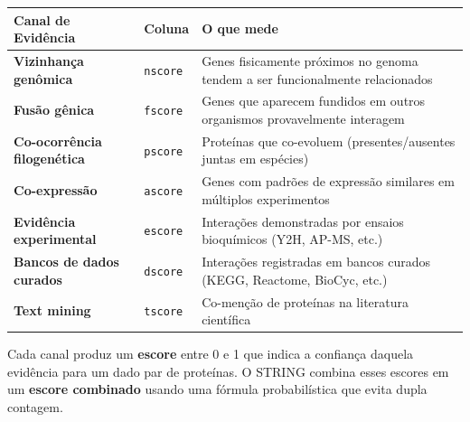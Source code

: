 \documentclass[
  letterpaper,
  DIV=11,
  numbers=noendperiod]{scrreprt}
\newcounter{none} %
\begin{document}
{\def\LTcaptype{none} %
\begin{longtable}[]{@{}
  >{\raggedright\arraybackslash}p{}
  >{\raggedright\arraybackslash}p{}
  >{\raggedright\arraybackslash}p{}@{}}
\toprule\noalign{}
\begin{minipage}[b]{\linewidth}\raggedright
Canal de Evidência
\end{minipage} & \begin{minipage}[b]{\linewidth}\raggedright
Coluna
\end{minipage} & \begin{minipage}[b]{\linewidth}\raggedright
O que mede
\end{minipage} \\
\midrule\noalign{}
\endhead
\bottomrule\noalign{}
\endlastfoot
\textbf{Vizinhança genômica} & \texttt{nscore} & Genes fisicamente
próximos no genoma tendem a ser funcionalmente relacionados \\
\textbf{Fusão gênica} & \texttt{fscore} & Genes que aparecem fundidos em
outros organismos provavelmente interagem \\
\textbf{Co-ocorrência filogenética} & \texttt{pscore} & Proteínas que
co-evoluem (presentes/ausentes juntas em espécies) \\
\textbf{Co-expressão} & \texttt{ascore} & Genes com padrões de expressão
similares em múltiplos experimentos \\
\textbf{Evidência experimental} & \texttt{escore} & Interações
demonstradas por ensaios bioquímicos (Y2H, AP-MS, etc.) \\
\textbf{Bancos de dados curados} & \texttt{dscore} & Interações
registradas em bancos curados (KEGG, Reactome, BioCyc, etc.) \\
\textbf{Text mining} & \texttt{tscore} & Co-menção de proteínas na
literatura científica \\
\end{longtable}
}

Cada canal produz um \textbf{escore} entre 0 e 1 que indica a confiança
daquela evidência para um dado par de proteínas. O STRING combina esses
escores em um \textbf{escore combinado} usando uma fórmula
probabilística que evita dupla contagem.
\end{document}
